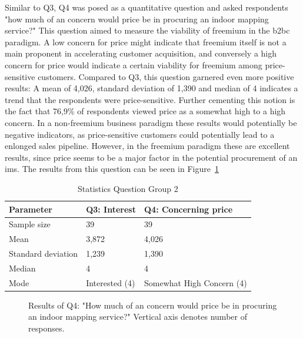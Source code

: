 Similar to Q3, Q4 was posed as a quantitative question and asked respondents "how much of an concern would price be in procuring an indoor mapping service?" This question aimed to measure the viability of freemium in the \gls{b2bc} paradigm. A low concern for price might indicate that freemium itself is not a main proponent in accelerating customer acquisition, and conversely a high concern for price would indicate a certain viability for freemium among price-sensitive customers. Compared to Q3, this question garnered even more positive results: A mean of 4,026, standard deviation of 1,390 and median of 4 indicates a trend that the respondents were price-sensitive. Further cementing this notion is the fact that 76,9\% of respondents viewed price as a somewhat high to a high concern. In a non-freemium business paradigm these results would potentially be negative indicators, as price-sensitive customers could potentially lead to a enlonged sales pipeline. However, in the freemium paradigm these are excellent results, since price seems to be a major factor in the potential procurement of an \gls{ims}. The results from this question can be seen in Figure~\ref{fig:q4}


\begin{table}[]
\centering
\caption{Statistics Question Group 2}
\label{q3q4stats}
\begin{tabular}{|l|l|l|}
\hline
\textbf{Parameter} & \textbf{Q3: Interest} & \textbf{Q4: Concerning price} \\ \hline
Sample size        & 39                    & 39                            \\ \hline
Mean               & 3,872                 & 4,026                         \\ \hline
Standard deviation & 1,239                 & 1,390                         \\ \hline
Median             & 4                     & 4                             \\ \hline
Mode               & Interested (4)        & Somewhat High Concern (4)     \\ \hline
\end{tabular}
\end{table}


\begin{figure}
    \centering
    \caption{Results of Q4: "How much of an concern would price be in procuring an indoor mapping service?" Vertical axis denotes number of responses.}
    \label{fig:q4}
\end{figure}

